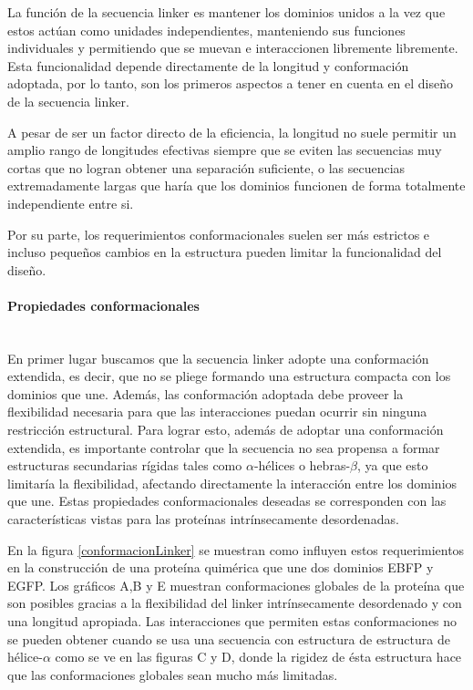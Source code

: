 La función de la secuencia linker es mantener los dominios unidos a la vez que estos actúan como unidades independientes, manteniendo sus funciones individuales y 
permitiendo que se muevan e interaccionen libremente libremente. 
Esta funcionalidad depende directamente de la longitud y conformación adoptada, por lo tanto, son los primeros aspectos a tener en cuenta en el diseño de la secuencia linker.

A pesar de ser un factor directo de la eficiencia\cite{robinson1998optimizing}, la longitud no suele permitir un amplio rango de longitudes efectivas siempre 
que se eviten las secuencias muy cortas que no logran obtener una separación suficiente, o las secuencias extremadamente largas que haría que los dominios funcionen de forma totalmente independiente entre si.

Por su parte, los requerimientos conformacionales suelen ser más estrictos e incluso pequeños cambios en la estructura pueden limitar la funcionalidad del diseño.

\paragraph{Propiedades conformacionales} \hspace{0pt} \\

En primer lugar buscamos que la secuencia linker adopte una conformación extendida, es decir, que no se pliege formando una estructura compacta con los dominios que une. 
Además, las conformación adoptada debe proveer la flexibilidad necesaria para que las interacciones puedan ocurrir sin ninguna restricción estructural.
Para lograr esto, además de adoptar una conformación extendida, es importante controlar que la secuencia no sea propensa a formar estructuras secundarias rígidas tales como $\alpha$-hélices o hebras-$\beta$, ya que esto
limitaría la flexibilidad, afectando directamente la interacción entre los dominios que une.
Estas propiedades conformacionales deseadas se corresponden con las características vistas para las proteínas intrínsecamente desordenadas. 

En la figura \ref{conformacionLinker} se muestran como influyen estos requerimientos en la construcción de una proteína quimérica que une dos dominios EBFP y EGFP. 
Los gráficos A,B y E muestran conformaciones globales de la proteína que son posibles gracias a la flexibilidad del linker intrínsecamente desordenado y con una longitud apropiada. 
Las interacciones que permiten estas conformaciones no se pueden obtener cuando se usa una secuencia con estructura de estructura de hélice-$\alpha$ como se ve en las figuras C y D, donde la rigidez de ésta estructura 
hace que las conformaciones globales sean mucho más limitadas.


